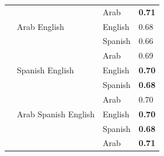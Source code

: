 \documentclass[runningheads]{llncs}
\begin{document}
\begin{table}[]
\begin{tabular}{@{}llll@{}}
                                 &                           & Arab                    & \textbf{0.71}                \\
                                 & Arab English              & English                 & 0.68                         \\
                                 &                           & Spanish                 & 0.66                         \\
                                 &                           & Arab                    & 0.69                         \\
                                 & Spanish English           & English                 & \textbf{0.70}                \\
                                 &                           & Spanish                 & \textbf{0.68}                \\
                                 &                           & Arab                    & 0.70                         \\
                                 & Arab Spanish English      & English                 & \textbf{0.70}                \\
                                 &                           & Spanish                 & \textbf{0.68}                \\
                                 &                           & Arab                    & \textbf{0.71}                \\ \bottomrule
\end{tabular}
\end{table}
\end{document}
